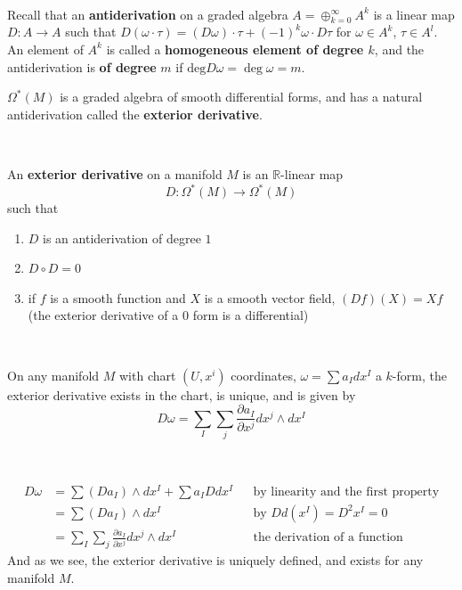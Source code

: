 \documentclass{article}
\begin{document}
\begin{remark}
  \

  Recall that an \textbf{antiderivation} on a graded algebra $A = \oplus_{k=0}^\infty A^k$ is a linear map $D: A \to A$ such that $D(\omega \cdot \tau) = (D\omega) \cdot \tau + (-1)^k\omega \cdot D\tau$ for $\omega \in A^k$, $\tau \in A^l$. An element of $A^k$ is called a \textbf{homogeneous element of degree $k$}, and the antiderivation is \textbf{of degree} $m$ if $\text{deg}D\omega = \deg \omega = m$.

  $\Omega^*(M)$ is a graded algebra of smooth differential forms, and has a natural antiderivation called the \textbf{exterior derivative}.
\end{remark}

\begin{definition}
  \

  An \textbf{exterior derivative} on a manifold $M$ is an $\mathbb{R}$-linear map $$D: \Omega^*(M) \to \Omega^*(M)$$such that
  \begin{enumerate}
    \item $D$ is an antiderivation of degree $1$
    \item $D \circ D = 0$
    \item if $f$ is a smooth function and $X$ is a smooth vector field, $(Df)(X) = Xf$ (the exterior derivative of a $0$ form is a differential)
  \end{enumerate}

\end{definition}

\begin{proposition}
  \

  On any manifold $M$ with chart $(U,x^i)$ coordinates, $\omega = \sum a_Idx^I$ a $k$-form, the exterior derivative exists in the chart, is unique, and is given by $$D\omega = \sum_I\sum_j \frac{\partial a_I}{\partial x^j} dx^j \wedge dx^I$$
\end{proposition}

\begin{customproof}
  \

  \begin{align*}
    D\omega &= \sum (Da_I) \wedge dx^I + \sum a_I Ddx^I &&\text{by linearity and the first property}\\
    &= \sum(Da_I) \wedge dx^I && \text{by $Dd(x^I) = D^2x^I = 0$}\\
    &= \sum_I \sum_j \frac{\partial a_I}{\partial x^j}dx^j \wedge dx^I && \text{the derivation of a function}
  \end{align*}And as we see, the exterior derivative is uniquely defined, and exists for any manifold $M$.
\end{customproof}
\end{document}
